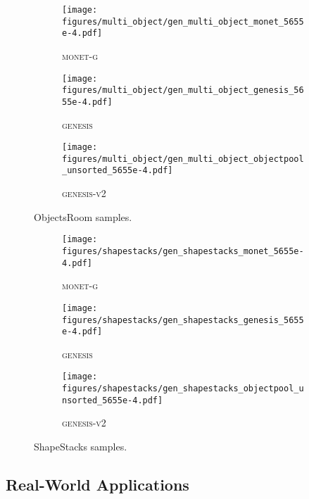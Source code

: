 \documentclass{article}
\begin{document}
\begin{figure}
    \centering
    \parbox{0.45\linewidth}{
    \begin{subfigure}{\linewidth}
		\texttt{[image: figures/multi\_object/gen\_multi\_object\_monet\_5655e-4.pdf]}
		\caption{\textsc{monet-g}}
		\vspace{6pt}
	\end{subfigure}
    \begin{subfigure}{\linewidth}
		\texttt{[image: figures/multi\_object/gen\_multi\_object\_genesis\_5655e-4.pdf]}
		\caption{\textsc{genesis}}
		\vspace{6pt}
	\end{subfigure}
	\begin{subfigure}{\linewidth}
		\texttt{[image: figures/multi\_object/gen\_multi\_object\_objectpool\_unsorted\_5655e-4.pdf]}
		\caption{\textsc{genesis-v2}}
	\end{subfigure}
	\caption{ObjectsRoom samples.}
	\label{fig:objectsroom_samples}
	}
	\qquad
	\parbox{0.45\linewidth}{
	\begin{subfigure}{\linewidth}
		\texttt{[image: figures/shapestacks/gen\_shapestacks\_monet\_5655e-4.pdf]}
		\caption{\textsc{monet-g}}
		\vspace{6pt}
	\end{subfigure}
	\begin{subfigure}{\linewidth}
		\texttt{[image: figures/shapestacks/gen\_shapestacks\_genesis\_5655e-4.pdf]}
		\caption{\textsc{genesis}}
		\vspace{6pt}
	\end{subfigure}
	\begin{subfigure}{\linewidth}
		\texttt{[image: figures/shapestacks/gen\_shapestacks\_objectpool\_unsorted\_5655e-4.pdf]}
		\caption{\textsc{genesis-v2}}
	\end{subfigure}
	\caption{ShapeStacks samples.}
	\label{fig:shapestacks_samples}
	}
\end{figure}


\subsection{Real-World Applications}
\label{sec:experiments:realworld}
\end{document}
